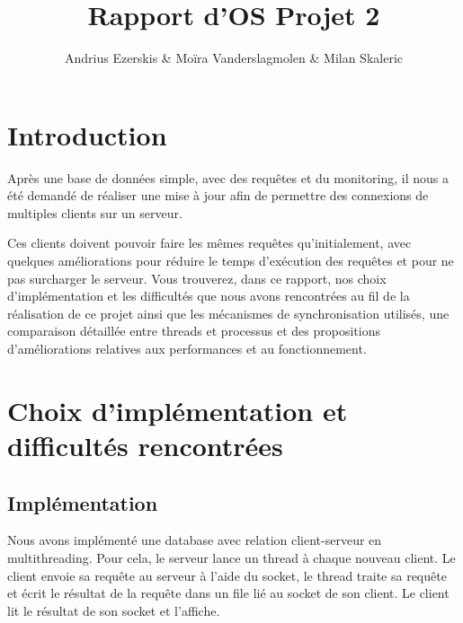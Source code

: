 \documentclass[utf8]{article}
\begin{document}
\begin{titlepage}


\author{Andrius Ezerskis \& Moïra Vanderslagmolen \& Milan Skaleric}
\title{Rapport d'OS Projet 2}

\maketitle
\end{titlepage}
\begin{large}

\section{Introduction}
\par
\indent

Après une base de données simple, avec des requêtes et du monitoring, il nous a
été demandé de réaliser une mise à jour afin de permettre des connexions de
multiples clients sur un serveur.

\par
\par

Ces clients doivent pouvoir faire les mêmes requêtes qu'initialement, avec
quelques améliorations pour réduire le temps d'exécution des requêtes et pour ne
pas surcharger le serveur. Vous trouverez, dans ce rapport, nos choix
d'implémentation et les difficultés que nous avons rencontrées au fil de la
réalisation de ce projet ainsi que les mécanismes de synchronisation utilisés,
une comparaison détaillée entre threads et processus et des propositions
d'améliorations relatives aux performances et au fonctionnement.

\par
\section{Choix d'implémentation et difficultés rencontrées}

\subsection{Implémentation}
\par
\indent

Nous avons implémenté une database avec relation client-serveur en
multithreading. Pour cela, le serveur lance un thread à chaque nouveau client.
Le client envoie sa requête au serveur à l'aide du socket, le thread traite sa
requête et écrit le résultat de la requête dans un file lié au socket de son
client. Le client lit le résultat de son socket et l'affiche.
\par

\end{large}
\end{document}

